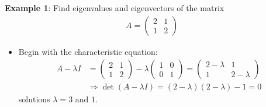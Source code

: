 \documentclass[10pt,a4paper]{article}
\begin{document}
\textbf{Example 1}: Find eigenvalues and eigenvectors of the matrix
\begin{align*}
    A = \begin{pmatrix}
        2&1 \\ 1&2
    \end{pmatrix}
\end{align*}
\begin{itemize}
    \item Begin with the characteristic equation:
    \begin{align*}
        A-\lambda I&=\left(\begin{array}{ll}
            2 & 1 \\
            1 & 2
            \end{array}\right)-\lambda\left(\begin{array}{ll}
            1 & 0 \\
            0 & 1
            \end{array}\right)=\left(\begin{array}{cc}
            2-\lambda & 1 \\
            1 & 2-\lambda
            \end{array}\right) \\
            &\Longrightarrow \operatorname{det}(A-\lambda I)=(2-\lambda)(2-\lambda)-1=0
    \end{align*}
    solutions $\lambda = 3 \text{ and } 1$.


\end{itemize}
\end{document}
